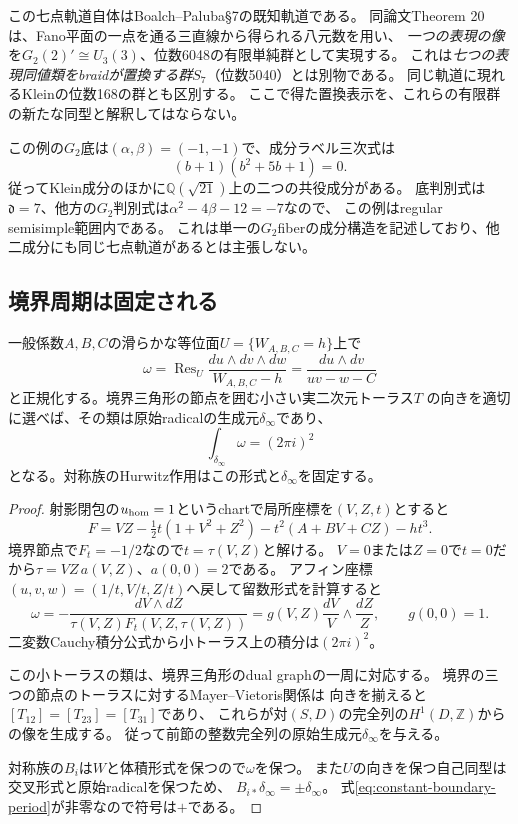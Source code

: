 この七点軌道自体はBoalch--Paluba\S7の既知軌道である。
同論文Theorem 20は、Fano平面の一点を通る三直線から得られる八元数を用い、
\emph{一つの表現の像}を$G_2(2)'\cong U_3(3)$、位数6048の有限単純群として実現する。
これは\emph{七つの表現同値類をbraidが置換する群}$S_7$（位数5040）とは別物である。
同じ軌道に現れるKleinの位数168の群とも区別する。
ここで得た置換表示を、これらの有限群の新たな同型と解釈してはならない。

この例の$G_2$底は$(\alpha,\beta)=(-1,-1)$で、成分ラベル三次式は
\[
 (b+1)(b^2+5b+1)=0.
\]
従ってKlein成分のほかに$\mathbb Q(\sqrt{21})$上の二つの共役成分がある。
底判別式は$\mathfrak d=7$、他方の$G_2$判別式は$\alpha^2-4\beta-12=-7$なので、
この例はregular semisimple範囲内である。
これは単一の$G_2$fiberの成分構造を記述しており、他二成分にも同じ七点軌道があるとは主張しない。

\subsection{境界周期は固定される}
\begin{theorem}[原始境界cycleの正規化周期]
\label{thm:boundary-residue-period}
一般係数$A,B,C$の滑らかな等位面$U=\{W_{A,B,C}=h\}$上で
\[
 \omega=\operatorname{Res}_{U}
 \frac{du\wedge dv\wedge dw}{W_{A,B,C}-h}
       =\frac{du\wedge dv}{uv-w-C}
\]
と正規化する。境界三角形の節点を囲む小さい実二次元トーラス$T$
の向きを適切に選べば、その類は原始radicalの生成元$\delta_\infty$であり、
\begin{equation}\label{eq:constant-boundary-period}
 \int_{\delta_\infty}\omega=(2\pi i)^2
\end{equation}
となる。対称族のHurwitz作用はこの形式と$\delta_\infty$を固定する。
\end{theorem}
\begin{proof}
射影閉包の$u_{\rm hom}=1$というchartで局所座標を$(V,Z,t)$とすると
\[
 F=VZ-\tfrac12t(1+V^2+Z^2)-t^2(A+BV+CZ)-ht^3.
\]
境界節点で$F_t=-1/2$なので$t=\tau(V,Z)$と解ける。
$V=0$または$Z=0$で$t=0$だから$\tau=VZ\,a(V,Z)$、$a(0,0)=2$である。
アフィン座標$(u,v,w)=(1/t,V/t,Z/t)$へ戻して留数形式を計算すると
\[
 \omega=-\frac{dV\wedge dZ}{\tau(V,Z)F_t(V,Z,\tau(V,Z))}
       =g(V,Z)\frac{dV}{V}\wedge\frac{dZ}{Z},\qquad g(0,0)=1.
\]
二変数Cauchy積分公式から小トーラス上の積分は$(2\pi i)^2$。

この小トーラスの類は、境界三角形のdual graphの一周に対応する。
境界の三つの節点のトーラスに対するMayer--Vietoris関係は
向きを揃えると$[T_{12}]=[T_{23}]=[T_{31}]$であり、
これらが対$(S,D)$の完全列の$H^1(D,\mathbb Z)$からの像を生成する。
従って前節の整数完全列の原始生成元$\delta_\infty$を与える。

対称族の$B_i$は$W$と体積形式を保つので$\omega$を保つ。
また$U$の向きを保つ自己同型は交叉形式と原始radicalを保つため、
$B_{i*}\delta_\infty=\pm\delta_\infty$。
式\eqref{eq:constant-boundary-period}が非零なので符号は$+$である。
\end{proof}

